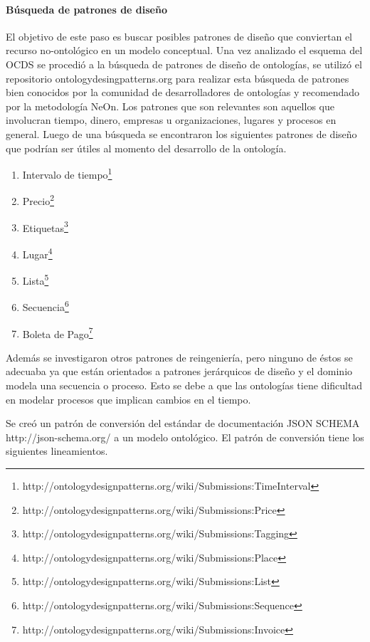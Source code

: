 \paragraph{Búsqueda de patrones de diseño}\hfill \break
El objetivo de este paso es buscar posibles patrones de diseño que conviertan el recurso no-ontológico en un modelo conceptual. 
Una vez analizado el esquema del OCDS se procedió a la búsqueda de patrones de diseño de ontologías, se utilizó el repositorio ontologydesingpatterns.org para realizar esta búsqueda de patrones bien conocidos por la comunidad de desarrolladores de ontologías y recomendado por la metodología NeOn.
Los patrones que son relevantes son aquellos que involucran tiempo, dinero, empresas u organizaciones, lugares y procesos en general. Luego de una búsqueda se encontraron los siguientes patrones de diseño que podrían ser útiles al momento del desarrollo de la ontología.
\begin{enumerate}
    \item Intervalo de tiempo\footnote{http://ontologydesignpatterns.org/wiki/Submissions:TimeInterval}
    \item Precio\footnote{http://ontologydesignpatterns.org/wiki/Submissions:Price} 
    \item Etiquetas\footnote{http://ontologydesignpatterns.org/wiki/Submissions:Tagging}
    \item Lugar\footnote{http://ontologydesignpatterns.org/wiki/Submissions:Place}
    \item Lista\footnote{http://ontologydesignpatterns.org/wiki/Submissions:List}
    \item Secuencia\footnote{http://ontologydesignpatterns.org/wiki/Submissions:Sequence}
    \item Boleta de Pago\footnote{http://ontologydesignpatterns.org/wiki/Submissions:Invoice} 
\end{enumerate}

Además se investigaron otros patrones de reingeniería, pero ninguno de éstos se adecuaba ya que están orientados a patrones jerárquicos de diseño y el dominio modela una secuencia o proceso. Esto se debe a que las ontologías tiene dificultad en modelar procesos que implican cambios en el tiempo\cite{Rock2019}.

Se creó un patrón de conversión del estándar de documentación JSON SCHEMA http://json-schema.org/ a un modelo ontológico. El patrón de conversión tiene los siguientes lineamientos.

